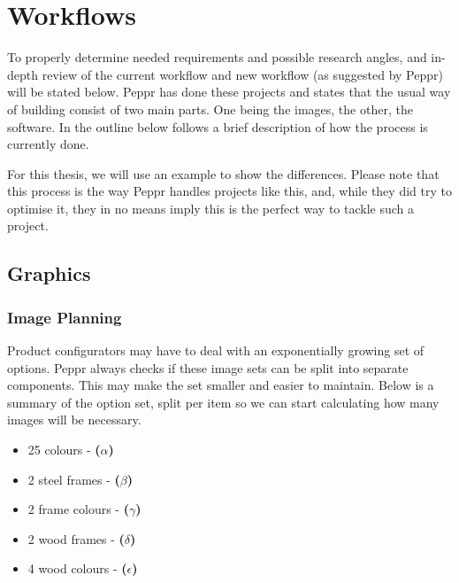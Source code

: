 \section{Workflows}
To properly determine needed requirements and possible research angles, and in-depth review of the current workflow and new workflow (as suggested by Peppr) will be stated below.
Peppr has done these projects and states that the usual way of building consist of two main parts. One being the images, the other, the software. In the outline below follows a brief description of how the process is currently done. 

For this thesis, we will use an example to show the differences. Please note that this process is the way Peppr handles projects like this, and, while they did try to optimise it, they in no means imply this is the perfect way to tackle such a project. 



\subsection{Graphics}

\subsubsection{Image Planning}
Product configurators may have to deal with an exponentially growing set of options. Peppr always checks if these image sets can be split into separate components. This may make the set smaller and easier to maintain. Below is a summary of the option set, split per item so we can start calculating how many images will be necessary.
\begin{itemize}
	\item 25 colours - \textbf{(\( \alpha \))}
	\item 2 steel frames - \textbf{(\( \beta \))}
	\item 2 frame colours - \textbf{(\( \gamma \))}
	\item 2 wood frames - \textbf{(\( \delta \))}
	\item 4 wood colours - \textbf{(\( \epsilon \))}
\end{itemize}

